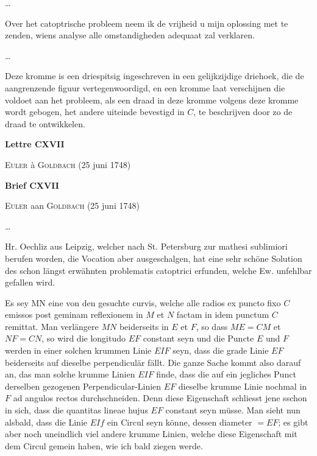 \documentclass[10pt,a4paper]{article}
\begin{document}
\begin{paracol}{2}
	\switchcolumn
	\par \ldots
	\par Over het catoptrische probleem neem ik de vrijheid u mijn oplossing met te zenden, wiens analyse alle omstandigheden adequaat zal verklaren.
	\par \ldots
	
	\par Deze kromme is een driespitsig ingeschreven in een gelijkzijdige driehoek, die de aangrenzende figuur vertegenwoordigd, en een kromme laat verschijnen die voldoet aan het probleem, als een draad in deze kromme volgens deze kromme wordt gebogen, het andere uiteinde bevestigd in $C$, te beschrijven door zo de draad te ontwikkelen.
	
	\switchcolumn*
		\begin{center}
		\par {}
		\par {\bf Lettre CXVII}
		\par {\textsc{Euler} à \textsc{Goldbach} (25 juni 1748)}
	\end{center}
	\switchcolumn
	
	\begin{center}
		\par {}
		\par {\bf Brief CXVII}
		\par {\textsc{Euler} aan \textsc{Goldbach} (25 juni 1748)}
	\end{center}
	\switchcolumn*
	
	\par \ldots
	\par Hr. Oechliz aus Leipzig, welcher nach St. Petersburg zur mathesi sublimiori berufen worden, die Vocation aber ausgeschalgen, hat eine sehr schöne Solution des schon längst erwähnten problematis catoptrici erfunden, welche Ew. unfehlbar gefallen wird.
	
	\par Es sey MN eine von den gesuchte curvis, welche alle radios ex puncto fixo $C$ emissos post geminam reflexionem in $M$ et $N$ factam in idem punctum $C$ remittat. Man verlängere $MN$ beiderseits in $E$ et $F$, so dass $ME=CM$ et $NF=CN$, so wird die longitudo $EF$ constant seyn und die Puncte $E$ und $F$ werden in einer solchen krummen Linie $EIF$ seyn, dass die grade Linie $EF$ beiderseits auf dieselbe perpendiculär fällt. Die ganze Sache kommt also darauf an, das man solche krumme Linien $EIF$ finde, dass die auf ein jegliches Punct derselben gezogenen Perpendicular-Linien $EF$ dieselbe krumme Linie nochmal in $F$ ad angulos rectos durchschneiden. Denn diese Eigenschaft schliesst jene sschon in sich, dass die quantitas lineae hujus $EF$ constant seyn müsse. Man sieht nun alsbald, dass die Linie $EIf$ ein Circul seyn könne, dessen diameter $=EF$; es gibt aber noch uneindlich viel andere krumme Linien, welche diese Eigenschaft mit dem Circul gemein haben, wie ich bald ziegen werde.
	

\end{paracol}
\end{document}
